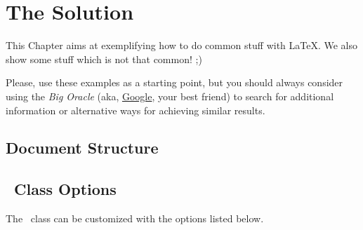 \chapter{The Solution}
\label{cha:a_short_latex_tutorial_with_examples}

This Chapter aims at exemplifying how to do common stuff with \LaTeX. We also show some stuff which is not that common! ;)

Please, use these examples as a starting point, but you should always consider using the \emph{Big Oracle} (aka, \href{http://www.google.com}{Google}, your best friend) to search for additional information or alternative ways for achieving similar results.

\section{Document Structure} %
\label{sec:document_structure}


\section{\unlthesisclass\ Class Options} %
\label{sec:package_options}

The \unlthesis\ class can be customized with the options listed below.

\newcommand{\classoption}[3]{\textbf{#1=OPT}\qquad #2\\\qquad\emph{#3}\\}

